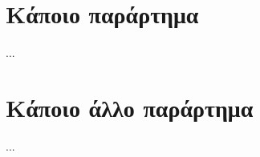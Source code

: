 \documentclass[report.tex]{subfiles}
\begin{document}
\begin{myappendices}

\clearpage
\setcounter{figure}{0}
\section{Κάποιο παράρτημα}

...

\clearpage
\setcounter{figure}{0}
\section{Κάποιο άλλο παράρτημα}

...

\end{myappendices}
\end{document}
